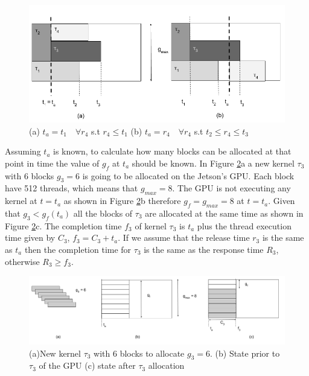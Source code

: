 \documentclass[
  12pt,
  a4paperpaper,
]{report}
\begin{document}
\begin{figure}
\centering
\includegraphics{source/figures/ta_example.png}
\caption{(a) \(t_a=t_1 \quad \forall r_4\) s.t \(r_4 \leq t_1\) (b)
\(t_a=r_4 \quad \forall r_4\) s.t \(t_2 \leq r_4 \leq t_3\)
\label{img:ta_example}}
\end{figure}

Assuming \(t_a\) is known, to calculate how many blocks
can be allocated at that point in time the value of \(g_f\) at \(t_a\) should be known.
In Figure \ref{img:new_kernel_1}a a new
kernel \(\tau_3\) with 6 blocks \(g_3 = 6\) is going to be allocated on the
Jetson's GPU. Each block have 512 threads, which means that
\(g_{max} = 8\). The GPU is not executing any kernel at \(t=t_a\) as
shown in Figure \ref{img:new_kernel_1}b therefore \(g_f = g_{max} = 8\)
at \(t=t_a\). Given that \(g_3 < g_f(t_a)\) all the blocks of \(\tau_3\) are
allocated at the same time as shown in Figure \ref{img:new_kernel_1}c. 
The completion time \(f_3\) of kernel \(\tau_3\) is \(t_a\) plus the thread
execution time given by \(C_3\), \(f_3 = C_3 + t_a\). If we assume that
the release time \(r_3\) is the same as \(t_a\) then the completion time
for \(\tau_3\) is the same as the response time \(R_3\), otherwise
\(R_3 \geq f_3\).

\begin{figure}
\centering
\includegraphics{source/figures/new_kernel_1.png}
\caption{(a)New kernel \(\tau_3\) with 6 blocks to allocate \(g_3 = 6\). (b)
State prior to \(\tau_3\) of the GPU (c) state after \(\tau_3\) allocation
\label{img:new_kernel_1}}
\end{figure}
\end{document}

